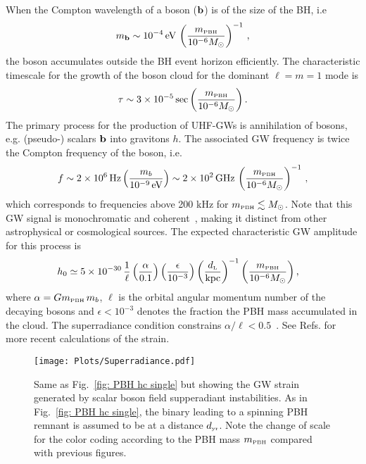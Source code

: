 \documentclass[11pt,a4paper]{article}
\newcommand{\lp }{\left (}
\newcommand{\rp }{\right )}
\newcommand{\PBH}{\text{\tiny PBH}}
\begin{document}
When the  Compton wavelength
of a boson (${\bf b}$) is  of the size of the BH, i.e
\begin{equation}
\label{eq:maMBH} 
m_{\bf b} \sim 10^{-4}\, \text{eV} \, \left( \frac{m_\text{\tiny PBH} }{ 10^{-6}M_\odot} \right)^{-1}   
\,,
\end{equation}
the boson  accumulates outside the BH event horizon efficiently. The characteristic  timescale for the growth of the boson cloud for the dominant $\ell = m =1$ mode is \cite{Brito:2015oca}
\begin{equation}
\tau \sim 3 \times 10^{-5}\, {\rm sec} \lp\frac{m_\PBH}{10^{-6} M_\odot} \rp .
\end{equation}
The primary process  for the production of UHF-GWs is  annihilation of bosons, e.g. (pseudo-) scalars $\bf{b}$ into gravitons $h$. The associated GW frequency is
twice the Compton frequency of the boson, i.e.  
\begin{equation}
\label{eq:fsprannihilation}
f \sim  2 \times  10^{6} \, \text{Hz} \left( \frac{m_b}{10^{-9} \, \text{eV}} \right) 
\sim
2 \times 10^2\,  {\rm GHz}\, \lp \frac{m_\text{\tiny PBH}}{10^{-6} M_\odot } \rp^{-1}
\, ,
\end{equation}
which corresponds to frequencies above 200 kHz for $m_\PBH \lesssim M_\odot$. 
Note that this GW signal is  monochromatic and coherent~\cite{Arvanitaki:2014wva}, making it distinct from  other astrophysical or cosmological sources.  The expected characteristic GW amplitude for this process is\cite{Arvanitaki:2012cn} 
\begin{align}
    h_0 &
\simeq 5 \times 10^{-30}\,  
\frac{1}{\ell}
    \lp \frac{\alpha}{0.1}\rp 
        \lp \frac{\epsilon}{10^{-3}}\rp 
\lp \frac{d_\text{\tiny L}}{{\rm kpc}}\rp ^{-1} 
\lp \frac{m_\text{\tiny PBH}}{10^{-6} M_\odot}\rp,
\label{eq:strain_axion_annihilation}
\end{align}
where $\alpha = G m_\text{\tiny PBH} \, m_b$, $\ell$ is the orbital angular momentum number of the decaying  bosons and $\epsilon < 10^{-3}$ denotes the fraction the PBH mass accumulated in the  cloud. {The superradiance condition constrains $\alpha/\ell < 0.5$~\cite{Arvanitaki:2010sy}.} See Refs. \cite{Brito:2014wla, arXiv:2010.13157} for more recent calculations of the strain. 
\begin{figure}[t!]
\centering
\texttt{[image: Plots/Superradiance.pdf]}
\caption{
Same as Fig.~\ref{fig: PBH hc single} but showing the GW strain generated by scalar boson field supperadiant instabilities.
As in Fig.~\ref{fig: PBH hc single}, the binary leading to a spinning PBH remnant is assumed to be at a distance $d_\text{\tiny yr}$.
Note the change of scale for the color coding according to the PBH mass $m_\text{\tiny PBH}$ compared with previous figures.  
}
\label{fig: PBH hc supperradiance}
\end{figure}
\end{document}
